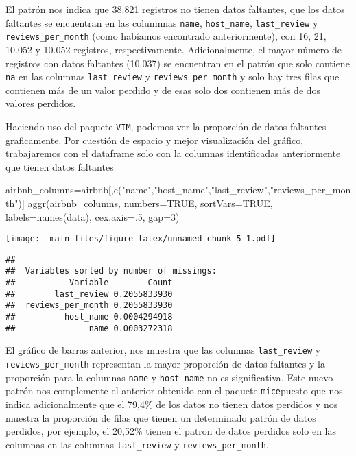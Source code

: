 \documentclass[
]{book}
\newenvironment{Shaded}{\begin{snugshade}}{\end{snugshade}}
\newcommand{\AttributeTok}[1]{\textcolor[rgb]{0.77,0.63,0.00}{#1}}
\newcommand{\ConstantTok}[1]{\textcolor[rgb]{0.00,0.00,0.00}{#1}}
\newcommand{\DecValTok}[1]{\textcolor[rgb]{0.00,0.00,0.81}{#1}}
\newcommand{\FunctionTok}[1]{\textcolor[rgb]{0.00,0.00,0.00}{#1}}
\newcommand{\NormalTok}[1]{#1}
\newcommand{\OtherTok}[1]{\textcolor[rgb]{0.56,0.35,0.01}{#1}}
\newcommand{\StringTok}[1]{\textcolor[rgb]{0.31,0.60,0.02}{#1}}
\begin{document}
El patrón nos indica que 38.821 registros no tienen datos faltantes, que los datos faltantes se encuentran en las colunmnas \texttt{name}, \texttt{host\_name}, \texttt{last\_review} y \texttt{reviews\_per\_month} (como habíamos encontrado anteriormente), con 16, 21, 10.052 y 10.052 registros, respectivamente. Adicionalmente, el mayor número de registros con datos faltantes (10.037) se encuentran en el patrón que solo contiene \texttt{na} en las columnas \texttt{last\_review} y \texttt{reviews\_per\_month} y solo hay tres filas que contienen más de un valor perdido y de esas solo dos contienen más de dos valores perdidos.

Haciendo uso del paquete \texttt{VIM}, podemos ver la proporción de datos faltantes graficamente. Por cuestión de espacio y mejor visualización del gráfico, trabajaremos con el dataframe solo con la columnas identificadas anteriormente que tienen datos faltantes

\begin{Shaded}
\begin{Highlighting}[]
\NormalTok{airbnb\_columns}\OtherTok{=}\NormalTok{airbnb[,}\FunctionTok{c}\NormalTok{(}\StringTok{"name"}\NormalTok{,}\StringTok{"host\_name"}\NormalTok{,}\StringTok{"last\_review"}\NormalTok{,}\StringTok{"reviews\_per\_month"}\NormalTok{)]}
\FunctionTok{aggr}\NormalTok{(airbnb\_columns, }\AttributeTok{numbers=}\ConstantTok{TRUE}\NormalTok{, }\AttributeTok{sortVars=}\ConstantTok{TRUE}\NormalTok{, }\AttributeTok{labels=}\FunctionTok{names}\NormalTok{(data), }\AttributeTok{cex.axis=}\NormalTok{.}\DecValTok{5}\NormalTok{, }\AttributeTok{gap=}\DecValTok{3}\NormalTok{)}
\end{Highlighting}
\end{Shaded}

\texttt{[image: \_main\_files/figure-latex/unnamed-chunk-5-1.pdf]}

\begin{verbatim}
## 
##  Variables sorted by number of missings: 
##           Variable        Count
##        last_review 0.2055833930
##  reviews_per_month 0.2055833930
##          host_name 0.0004294918
##               name 0.0003272318
\end{verbatim}

El gráfico de barras anterior, nos muestra que las columnas \texttt{last\_review} y \texttt{reviews\_per\_month} representan la mayor proporción de datos faltantes y la proporción para la columnas \texttt{name} y \texttt{host\_name} no es significativa. Este nuevo patrón nos complemente el anterior obtenido con el paquete \texttt{mice}puesto que nos indica adicionalmente que el 79,4\% de los datos no tienen datos perdidos y nos muestra la proporción de filas que tienen un determinado patrón de datos perdidos, por ejemplo, el 20,52\% tienen el patron de datos perdidos solo en las columnas en las columnas \texttt{last\_review} y \texttt{reviews\_per\_month}.
\end{document}
